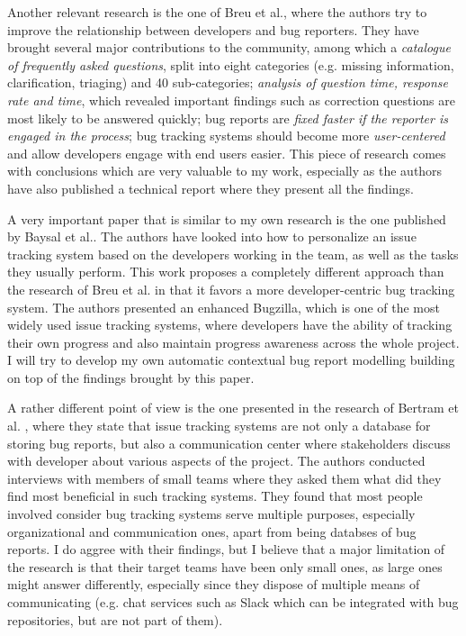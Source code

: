 \documentclass[11pt,english,twocolumn]{article}
\begin{document}
Another relevant research is the one of Breu et al.\cite{breu2010information},
where the authors try to improve the relationship between developers and
bug reporters. They have brought several major contributions to the community,
among which a \emph{catalogue of frequently asked questions}, split into
eight categories (e.g. missing information, clarification, triaging) and 
40 sub-categories; \emph{analysis of question time, response rate and time},
which revealed important findings such as correction questions are most 
likely to be answered quickly; bug reports are \emph{fixed faster if the
reporter is engaged in the process}; bug tracking systems should become
more \emph{user-centered} and allow developers engage with end users 
easier. This piece of research comes with conclusions which are very 
valuable to my work, especially as the authors have also published a 
technical report \cite{breu2009appendix} where they present all the findings.

A very important paper that is similar to my own research is the one 
published by Baysal et al.\cite{baysal2013situational}. The authors
have looked into how to personalize an issue tracking system based on the
developers working in the team, as well as the tasks they usually perform.
This work proposes a completely different approach than the research of
Breu et al.\cite{breu2010information} in that it favors a more 
developer-centric bug tracking system. The authors presented an enhanced
Bugzilla, which is one of the most widely used issue tracking systems, where
developers have the ability of tracking their own progress and also maintain
progress awareness across the whole project. I will try to develop my
own automatic contextual bug report modelling building on top of the findings
brought by this paper.

A rather different point of view is the one presented in the research
of Bertram et al. \cite{bertram2010communication}, where they state that
issue tracking systems are not only a database for storing bug reports,
but also a communication center where stakeholders discuss with developer
about various aspects of the project. The authors conducted interviews with
members of small teams where they asked them what did they find most beneficial
in such tracking systems. They found that most people involved consider
bug tracking systems serve multiple purposes, especially organizational and
communication ones, apart from being databses of bug reports. I do aggree 
with their findings, but I believe that a major limitation of the research
is that their target teams have been only small ones, as large ones might
answer differently, especially since they dispose of multiple means of 
communicating (e.g. chat services such as Slack which can be integrated 
with bug repositories, but are not part of them).
\end{document}
